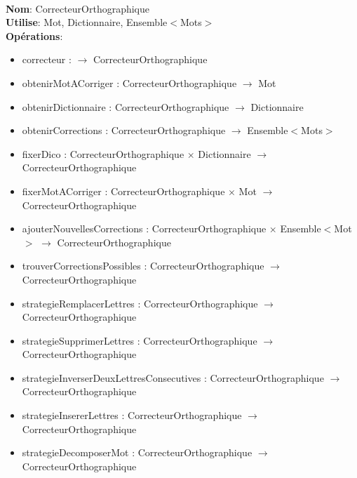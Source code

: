 \documentclass{article}
\begin{document}
    \noindent
    \\
    \textbf{Nom}: CorrecteurOrthographique \\
    \textbf{Utilise}: Mot, Dictionnaire, Ensemble$<$Mots$>$ \\
    \textbf{Opérations}: \begin{itemize}[label=$\ $, leftmargin=2cm, itemsep=0cm]
        \item correcteur : $\rightarrow$ CorrecteurOrthographique
        \item obtenirMotACorriger : CorrecteurOrthographique $\rightarrow$ Mot
        \item obtenirDictionnaire : CorrecteurOrthographique $\rightarrow$ Dictionnaire
        \item obtenirCorrections : CorrecteurOrthographique $\rightarrow$ Ensemble$<$Mots$>$
        \item fixerDico : CorrecteurOrthographique $\times$ Dictionnaire $\rightarrow$ CorrecteurOrthographique
        \item fixerMotACorriger : CorrecteurOrthographique $\times$ Mot $\rightarrow$ CorrecteurOrthographique
        \item ajouterNouvellesCorrections : CorrecteurOrthographique $\times$ Ensemble$<$Mot$>$ $\rightarrow$ CorrecteurOrthographique
        \item trouverCorrectionsPossibles : CorrecteurOrthographique $\rightarrow$ CorrecteurOrthographique
        \item strategieRemplacerLettres : CorrecteurOrthographique $\rightarrow$ CorrecteurOrthographique
        \item strategieSupprimerLettres : CorrecteurOrthographique $\rightarrow$ CorrecteurOrthographique
        \item strategieInverserDeuxLettresConsecutives : CorrecteurOrthographique $\rightarrow$ CorrecteurOrthographique
        \item strategieInsererLettres : CorrecteurOrthographique $\rightarrow$ CorrecteurOrthographique
        \item strategieDecomposerMot : CorrecteurOrthographique $\rightarrow$ CorrecteurOrthographique
    \end{itemize}
\end{document}

